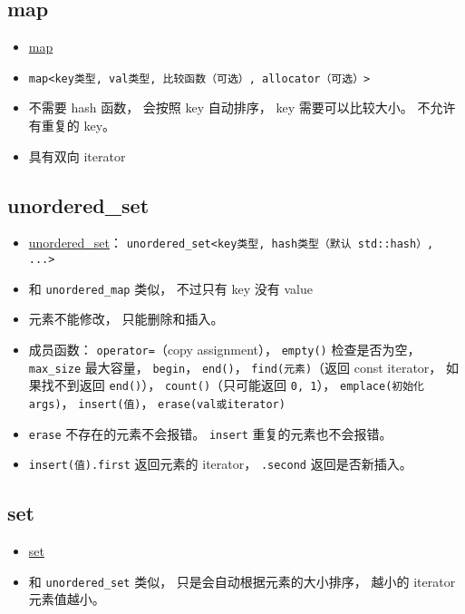 \subsection{map}
\begin{itemize}
\item \href{https://cplusplus.com/reference/map/map/}{map}
\item \verb|map<key类型, val类型, 比较函数（可选）, allocator（可选）>|
\item 不需要 hash 函数， 会按照 key 自动排序， key 需要可以比较大小。 不允许有重复的 key。
\item 具有双向 iterator
\end{itemize}

\subsection{unordered\_set}
\begin{itemize}
\item \href{https://cplusplus.com/reference/unordered_set/unordered_set/}{unordered\_set}： \verb|unordered_set<key类型, hash类型（默认 std::hash）, ...>|
\item 和 \verb|unordered_map| 类似， 不过只有 key 没有 value
\item 元素不能修改， 只能删除和插入。
\item 成员函数： \verb|operator=|（copy assignment）， \verb|empty()| 检查是否为空， \verb|max_size| 最大容量， \verb|begin|， \verb|end()|， \verb|find(元素)|（返回 const iterator， 如果找不到返回 \verb|end()|）， \verb|count()|（只可能返回 \verb|0, 1|）， \verb|emplace(初始化args)|， \verb|insert(值)|， \verb|erase(val或iterator)|
\item \verb|erase| 不存在的元素不会报错。 \verb|insert| 重复的元素也不会报错。
\item \verb|insert(值).first| 返回元素的 iterator， \verb|.second| 返回是否新插入。
\end{itemize}

\subsection{set}
\begin{itemize}
\item \href{https://en.cppreference.com/w/cpp/container/set}{set}
\item 和 \verb|unordered_set| 类似， 只是会自动根据元素的大小排序， 越小的 iterator 元素值越小。
\end{itemize}

